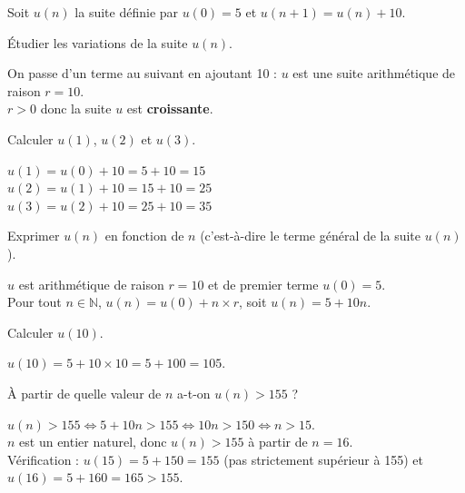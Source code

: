 \documentclass[11pt,a4paper]{article}  %
\begin{document}
\exerciceDS{}
Soit $u(n)$ la suite définie par $u(0)=5$ et $u(n+1)=u(n)+10$.
\begin{enumMet}
	\item Étudier les variations de la suite $u(n)$.
	\par
	\begin{corrBox}
		On passe d'un terme au suivant en ajoutant 10 : $u$ est une suite arithmétique de raison $r=10$.\\
		$r>0$ donc la suite $u$ est \textbf{croissante}.
	\end{corrBox}

	\item Calculer $u(1)$, $u(2)$ et $u(3)$.
	\par
	\begin{corrBox}
		$u(1)=u(0)+10=5+10=15$\\
		$u(2)=u(1)+10=15+10=25$\\
		$u(3)=u(2)+10=25+10=35$
	\end{corrBox}

	\item Exprimer $u(n)$ en fonction de $n$ (c'est-à-dire le terme général de la suite $u(n)$).
	\par
	\begin{corrBox}
		$u$ est arithmétique de raison $r=10$ et de premier terme $u(0)=5$.\\
		Pour tout $n\in\mathbb{N}$, $u(n)=u(0)+n\times r$, soit $u(n)=5+10n$.
	\end{corrBox}

	\item Calculer $u(10)$.
	\par
	\begin{corrBox}
		$u(10)=5+10\times 10=5+100=105$.
	\end{corrBox}

	\item À partir de quelle valeur de $n$ a-t-on $u(n)>155$ ?
	\par
	\begin{corrBox}
		$u(n)>155 \iff 5+10n>155 \iff 10n>150 \iff n>15$.\\
		$n$ est un entier naturel, donc $u(n)>155$ à partir de $n=16$.\\
		Vérification : $u(15)=5+150=155$ (pas strictement supérieur à 155) et $u(16)=5+160=165>155$.
	\end{corrBox}
\end{enumMet}
\end{document}
